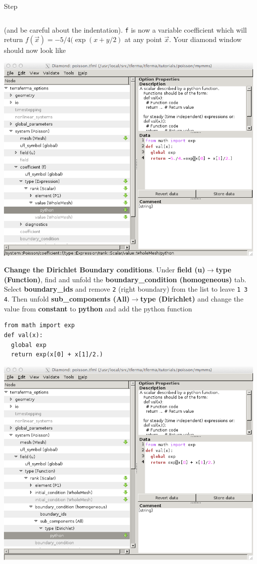 \begin{steps}{Step}
\begin{lstlisting}[style=python]
  \end{lstlisting}
(and be careful about the indentation). \texttt{f} is now a variable coefficient which will return $f(\vec{x}) = -5/4(\exp(x + y/2)$ at any point $\vec{x}$. Your diamond window should now look like
\begin{center}
\includegraphics[width=\diamondwidth]{figures/screendumps/diamond_poisson_mms_f_value.png}
  \end{center}
\item \textbf{Change the Dirichlet Boundary conditions}.  Under \textbf{field (u)}$\rightarrow$\textbf{type (Function)}, find and unfold the \textbf{boundary\_condition (homogeneous)} tab.  Select \textbf{boundary\_ids} and remove \texttt{2} (right boundary) from the list to leave \texttt{1 3 4}.  Then unfold \textbf{sub\_components (All)}$\rightarrow$\textbf{type (Dirichlet)} and change the value from \textbf{constant} to \textbf{python} and add the python function
\begin{lstlisting}[style=python]
from math import exp
def val(x):
  global exp
  return exp(x[0] + x[1]/2.)    
\end{lstlisting}
\begin{center}
\includegraphics[width=\diamondwidth]{figures/screendumps/diamond_poisson_mms_bcs.png}

\end{center}
\end{steps}
